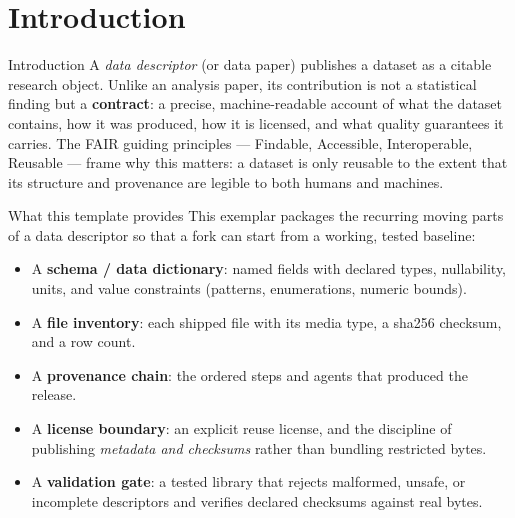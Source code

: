 \documentclass[
  ignorenonframetext,
]{beamer}
\author{\texorpdfstring{}{}}
\date{}
\providecommand{\tightlist}{%
  \setlength{\itemsep}{0pt}\setlength{\parskip}{0pt}}
\begin{document}
\section{Introduction}\label{sec:introduction}

\begin{frame}[allowframebreaks]{Introduction}
A \emph{data descriptor} (or data paper) publishes a dataset as a
citable research object. Unlike an analysis paper, its contribution is
not a statistical finding but a \textbf{contract}: a precise,
machine-readable account of what the dataset contains, how it was
produced, how it is licensed, and what quality guarantees it carries.
The FAIR guiding principles --- Findable, Accessible, Interoperable,
Reusable  --- frame why this matters: a dataset
is only reusable to the extent that its structure and provenance are
legible to both humans and machines.
\end{frame}

\begin{frame}[allowframebreaks]{What this template provides}
\protect{}\label{what-this-template-provides}
This exemplar packages the recurring moving parts of a data descriptor
so that a fork can start from a working, tested baseline:

\begin{itemize}
\tightlist
\item
  A \textbf{schema / data dictionary}: named fields with declared types,
  nullability, units, and value constraints (patterns, enumerations,
  numeric bounds).
\item
  A \textbf{file inventory}: each shipped file with its media type, a
  sha256 checksum, and a row count.
\item
  A \textbf{provenance chain}: the ordered steps and agents that
  produced the release.
\item
  A \textbf{license boundary}: an explicit reuse license, and the
  discipline of publishing \emph{metadata and checksums} rather than
  bundling restricted bytes.
\item
  A \textbf{validation gate}: a tested library that rejects malformed,
  unsafe, or incomplete descriptors and verifies declared checksums
  against real bytes.
\end{itemize}
\end{frame}
\end{document}
